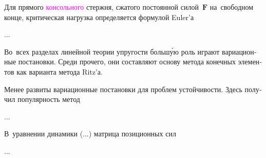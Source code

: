 
\begin{otherlanguage}{russian}

Для прямого \textcolor{magenta}{консольного} стержня, сжатого постоянной силой~$\bm{F}$ на~свободном конце, критическая нагрузка определяется формулой Euler’а

...



\end{otherlanguage}



\begin{otherlanguage}{russian}

Во~всех разделах линейной теории упругости больш\'{у}ю роль играют вариационные постановки.
Среди прочего, они составляют основу метода конечных элементов как варианта метода Ritz’а.

Менее развиты вариационные постановки для проблем устойчивости.
Здесь получил популярность метод

...



\end{otherlanguage}



\begin{otherlanguage}{russian}

В~уравнении динамики (...) матрица позиционных сил

...



\end{otherlanguage}

